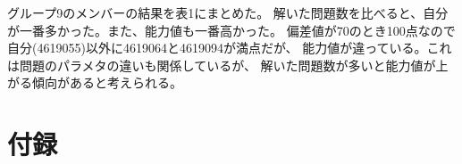 \documentclass[12pt]{jarticle}
\begin{document}
グループ9のメンバーの結果を表1にまとめた。
解いた問題数を比べると、自分が一番多かった。また、能力値も一番高かった。
偏差値が70のとき100点なので自分(4619055)以外に4619064と4619094が満点だが、
能力値が違っている。これは問題のパラメタの違いも関係しているが、
解いた問題数が多いと能力値が上がる傾向があると考えられる。



\clearpage
\appendix
\section{付録}
\end{document}
